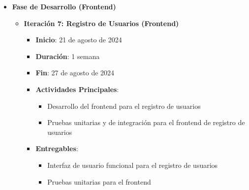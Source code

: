 \documentclass{article}
\begin{document}
\begin{itemize}
    \item \textbf{Fase de Desarrollo (Frontend)}
          \begin{itemize}
              \item \textbf{Iteración 7: Registro de Usuarios (Frontend)}
                    \begin{itemize}
                        \item \textbf{Inicio}: 21 de agosto de 2024
                        \item \textbf{Duración}: 1 semana
                        \item \textbf{Fin}: 27 de agosto de 2024
                        \item \textbf{Actividades Principales}:
                              \begin{itemize}
                                  \item Desarrollo del frontend para el registro de usuarios
                                  \item Pruebas unitarias y de integración para el frontend de registro de usuarios
                              \end{itemize}
                        \item \textbf{Entregables}:
                              \begin{itemize}
                                  \item Interfaz de usuario funcional para el registro de usuarios
                                  \item Pruebas unitarias para el frontend
                              \end{itemize}
                    \end{itemize}


\end{itemize}
\end{itemize}
\end{document}
